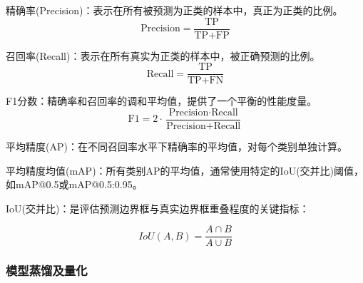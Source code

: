 \documentclass[a4paper, UTF8, fontsize=12pt]{ctexart} %
\numberwithin{equation}{section} %
\begin{document}
\begin{parlist}
    \item 精确率(Precision)：表示在所有被预测为正类的样本中，真正为正类的比例。
    \begin{equation}
        \text{Precision} = \frac{\text{TP}}{\text{TP} + \text{FP}}
    \end{equation}

    \item 召回率(Recall)：表示在所有真实为正类的样本中，被正确预测的比例。
    \begin{equation}
        \text{Recall} = \frac{\text{TP}}{\text{TP} + \text{FN}}
    \end{equation}

    \item F1分数：精确率和召回率的调和平均值，提供了一个平衡的性能度量。
    \begin{equation}
        \text{F1} = 2 \cdot \frac{\text{Precision} \cdot \text{Recall}}{\text{Precision} + \text{Recall}}
    \end{equation}

    \item 平均精度(AP)：在不同召回率水平下精确率的平均值，对每个类别单独计算。

    \item 平均精度均值(mAP)：所有类别AP的平均值，通常使用特定的IoU(交并比)阈值，如mAP@0.5或mAP@0.5:0.95。

    \item IoU(交并比)：是评估预测边界框与真实边界框重叠程度的关键指标：
\end{parlist}

\begin{equation}
IoU(A, B) = \frac{A \cap B}{A \cup B}
\end{equation}

\subsubsection{模型蒸馏及量化}
\end{document}
